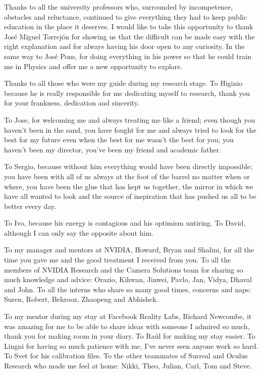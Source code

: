 Thanks to all the university professors who, surrounded by incompetence, obstacles and reluctance, continued to give everything they had to keep public education in the place it deserves. I would like to take this opportunity to thank José Miguel Torrejón for showing us that the difficult can be made easy with the right explanation and for always having his door open to any curiosity. In the same way to José Pons, for doing everything in his power so that he could train me in Physics and offer me a new opportunity to explore.

Thanks to all those who were my guide during my research stage. To Higinio because he is really responsible for me dedicating myself to research, thank you for your frankness, dedication and sincerity.

To Jose, for welcoming me and always treating me like a friend; even though you haven't been in the sand, you have fought for me and always tried to look for the best for my future even when the best for me wasn't the best for you; you haven't been my director, you've been my friend and academic father.

To Sergio, because without him everything would have been directly impossible; you have been with all of us always at the foot of the barrel no matter when or where, you have been the glue that has kept us together, the mirror in which we have all wanted to look and the source of inspiration that has pushed us all to be better every day.

To Ivo, because his energy is contagious and his optimism untiring. To David, although I can only say the opposite about him.

To my manager and mentors at NVIDIA, Howard, Bryan and Shalini, for all the time you gave me and the good treatment I received from you. To all the members of NVIDIA Research and the Camera Solutions team for sharing so much knowledge and advice: Orazio, Kihwan, Jinwei, Pavlo, Jan, Vidya, Dhaval and John. To all the interns who share so many good times, concerns and naps: Suren, Robert, Behrooz, Zhaopeng and Abhishek.

To my mentor during my stay at Facebook Reality Labs, Richard Newcombe, it was amazing for me to be able to share ideas with someone I admired so much, thank you for making room in your diary. To Raúl for making my stay easier. To Lingni for having so much patience with me, I've never seen anyone work so hard. To Svet for his calibration files. To the other teammates of Surreal and Oculus Research who made me feel at home: Nikki, Theo, Julian, Carl, Tom and Steve.

